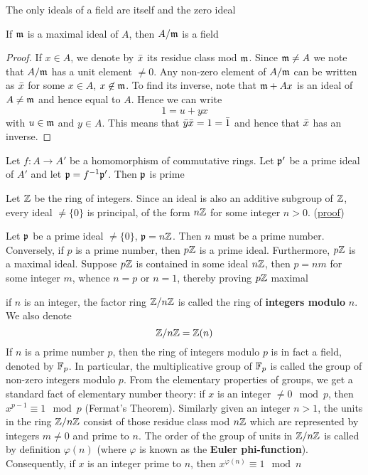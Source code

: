 \documentclass[11pt]{article}
\begin{document}
The only ideals of a field are itself and the zero ideal

\begin{proposition}[]
If \(\mathfrak{m}\) is a maximal ideal of \(A\), then \(A/\mathfrak{m}\) is a field
\end{proposition}

\begin{proof}
If \(x\in A\), we denote by \(\bar{x}\) its residue class mod \(\mathfrak{m}\). Since \(\mathfrak{m}\neq A\) we note
that \(A/\mathfrak{m}\)  has a unit element \(\neq 0\). Any non-zero element of \(A/\mathfrak{m}\) can be written
as \(\bar{x}\) for some \(x\in A\), \(x\not\in\mathfrak{m}\). To find its inverse, note that \(\mathfrak{m}+Ax\) is an ideal
of \(A\neq\mathfrak{m}\) and hence equal to \(A\). Hence we can write
\begin{equation*}
1=u+yx
\end{equation*}
with \(u\in\mathfrak{m}\) and \(y\in A\). This means that \(\bar{y}\bar{x}=1=\bar{1}\) and hence that \(\bar{x}\) has
an inverse.
\end{proof}

\begin{proposition}[]
Let \(f:A\to A'\) be a homomorphism of commutative rings. Let \(\mathfrak{p}'\) be a prime ideal of \(A'\) and
let \(\mathfrak{p}=f^{-1}\mathfrak{p}'\). Then \(\mathfrak{p}\) is prime
\end{proposition}

\begin{examplle}[]
Let \(\mathbb{Z}\) be the ring of integers. Since an ideal is also an additive subgroup of \(\mathbb{Z}\), every
ideal \(\neq\{0\}\) is principal, of the form \(n\mathbb{Z}\) for some integer \(n>0\). (\href{https://math.stackexchange.com/questions/101348/show-that-every-ideal-of-the-ring-mathbb-z-is-principal}{proof})

Let \(\mathfrak{p}\) be a prime ideal \(\neq\{0\}\), \(\mathfrak{p}=n\mathbb{Z}\). Then \(n\) must be a prime number. Conversely,
if \(p\) is a prime number, then \(p\mathbb{Z}\) is a prime ideal. Furthermore, \(p\mathbb{Z}\) is a maximal ideal.
Suppose \(p\mathbb{Z}\) is contained in some ideal \(n\mathbb{Z}\), then \(p=nm\) for some integer \(m\),
whence \(n=p\) or \(n=1\), thereby proving \(p\mathbb{Z}\) maximal
\end{examplle}

if \(n\) is an integer, the factor ring \(\mathbb{Z}/n\mathbb{Z}\) is called the ring of \textbf{integers modulo} \(n\). We
also denote
\begin{equation*}
\mathbb{Z}/n\mathbb{Z}=\mathbb{Z}(n)
\end{equation*}
If \(n\) is a prime number \(p\), then the ring of integers modulo \(p\) is in fact a field,
denoted by \(\mathbb{F}_p\). In particular, the multiplicative group of \(\mathbb{F}_p\) is called the group of
non-zero integers modulo \(p\). From the elementary properties of groups, we get a standard fact
of elementary number theory: if \(x\) is an integer \(\neq 0\mod p\), then \(x^{p-1}\equiv 1\mod p\)
(Fermat's Theorem). Similarly given an integer \(n>1\), the units in the ring \(\mathbb{Z}/n\mathbb{Z}\) consist
of those residue class mod \(n\mathbb{Z}\) which are represented by integers \(m\neq 0\) and prime to \(n\).
The order of the group of units in \(\mathbb{Z}/n\mathbb{Z}\) is called by definition \(\varphi(n)\) (where \(\varphi\) is known as
the \textbf{Euler phi-function}). Consequently, if \(x\) is an integer prime to \(n\),
then \(x^{\varphi(n)}\equiv 1\mod n\)
\end{document}
